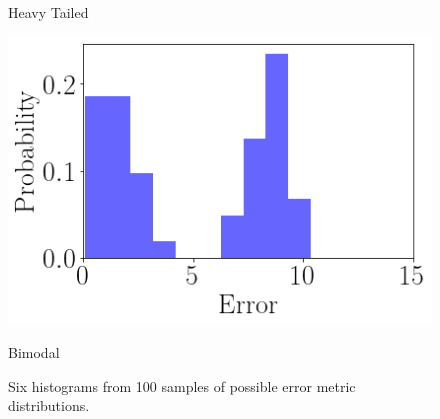 \begin{figure}[ht]
\begin{minipage}[b]{0.5\linewidth}
        \caption{Heavy Tailed}
        \vspace{4ex}
        \label{heavy_tailed_distributions_hist}
    \end{minipage}%
    \begin{minipage}[b]{0.5\linewidth}
        \centering
        \includegraphics[width=\linewidth]{./img/distributions/twin_peaks_hist.png}
        \caption{Bimodal}
        \label{bimodal_distribution_hist}
        \vspace{4ex}
    \end{minipage}
    \caption{Six histograms from 100 samples of possible error metric distributions.}
    \label{fig:error_metric_distributions_hist}
\end{figure}


